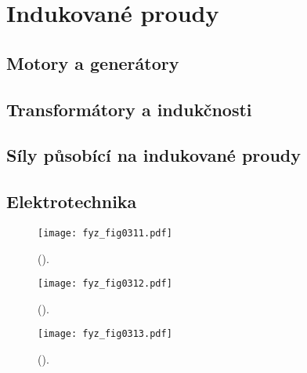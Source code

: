 \setchaptertoc
\chapter{Indukované proudy}\label{fyz:IIchapXVI}


\section{Motory a generátory}\label{fyz:IIchapXVIsecI}


\section{Transformátory a indukčnosti}\label{fyz:IIchapXVIsecII}

  
\section{Síly působící na indukované proudy}\label{fyz:IIchapXVIsecIII}


\section{Elektrotechnika}\label{fyz:IIchapXVIsecIV}

  \begin{figure}[ht!]  %
    \centering
    \texttt{[image: fyz\_fig0311.pdf]}
    \caption{
             (\cite[s.~148]{Feynman02}).}
    \label{fyz:fig0311}
  \end{figure}

  \begin{figure}[ht!]  %
    \centering
    \texttt{[image: fyz\_fig0312.pdf]}
    \caption{
             (\cite[s.~148]{Feynman02}).}
    \label{fyz:fig0312}
  \end{figure}

  \begin{figure}[ht!]  %
    \centering
    \texttt{[image: fyz\_fig0313.pdf]}
    \caption{
             (\cite[s.~148]{Feynman02}).}
    \label{fyz:fig0313}
  \end{figure}

